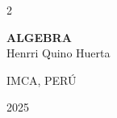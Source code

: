 \begin{titlepage}
	\begin{center}
		
		

		

		\begin{spacing}{2}
			
		 {\huge \textbf{ALGEBRA}}\\[10pt]
		 
		 
		 {\Large Henrri Quino Huerta}
			
		\end{spacing}

		
		\vspace{3cm}
	
		{\Large IMCA, PERÚ}
		
		\vspace{0.3cm}
		{\Large 2025}
	\end{center}

\end{titlepage}

